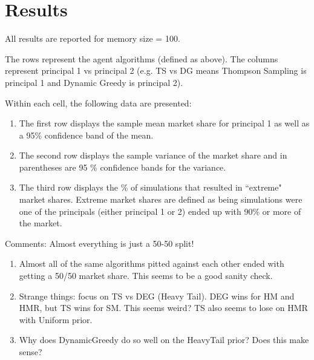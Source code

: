 \documentclass[11pt,letterpaper]{article}
\begin{document}
\section*{Results}
All results are reported for memory size = 100. \\
\vspace{0.25cm}

The rows represent the agent algorithms (defined as above). The columns represent principal 1 vs principal 2 (e.g. TS vs DG means Thompson Sampling is principal 1 and Dynamic Greedy is principal 2).  \\
\vspace{0.1cm}

Within each cell, the following data are presented: \\

\begin{enumerate}
\item The first row displays the sample mean market share for principal 1 as well as a 95\% confidence band of the mean.

\item The second row displays the sample variance of the market share and in parentheses are 95 \% confidence bands for the variance.

\item The third row displays the \% of simulations that resulted in ``extreme" market shares. Extreme market shares are defined as being simulations were one of the principals (either principal 1 or 2) ended up with 90\% or more of the market.
\end{enumerate}

Comments: Almost everything is just a 50-50 split!
\begin{enumerate}
\item Almost all of the same algorithms pitted against each other ended with getting a 50/50 market share. This seems to be a good sanity check.
\item Strange things: focus on TS vs DEG (Heavy Tail). DEG wins for HM and HMR, but TS wins for SM. This seems weird? TS also seems to lose on HMR with Uniform prior.
\item Why does DynamicGreedy do so well on the HeavyTail prior? Does this make sense?
\end{enumerate}
\end{document}
